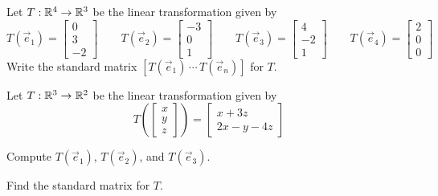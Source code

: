 \begin{activity}{3}
  Let $T: \mathbb{R}^4 \rightarrow \mathbb{R}^3$ be the linear transformation given by
  \[
    T\left(\vec e_1 \right)
  =
    \begin{bmatrix} 0 \\ 3 \\ -2\end{bmatrix}
  \hspace{2em}
    T\left(\vec e_2 \right)
  =
    \begin{bmatrix} -3 \\ 0 \\ 1\end{bmatrix}
  \hspace{2em}
    T\left(\vec e_3 \right)
  =
    \begin{bmatrix} 4 \\ -2 \\ 1\end{bmatrix}
  \hspace{2em}
    T\left(\vec e_4 \right)
  =
    \begin{bmatrix} 2 \\ 0 \\ 0\end{bmatrix}
  \]
Write the standard matrix \([T(\vec e_1) \,\cdots\, T(\vec e_n)]\) for \(T\).
\end{activity}

\begin{activity}{5}
  Let \(T: \mathbb{R}^3 \rightarrow \mathbb{R}^2\) be the linear transformation given by
\[T\left(\begin{bmatrix} x\\ y \\ z \end{bmatrix} \right) = \begin{bmatrix} x+3z \\ 2x-y-4z \end{bmatrix}\]
\begin{subactivity}
Compute \(T(\vec e_1)\), \(T(\vec e_2)\), and \(T(\vec e_3)\).
\end{subactivity}
\begin{subactivity}
Find the standard matrix for \(T\).
\end{subactivity}
\end{activity}

